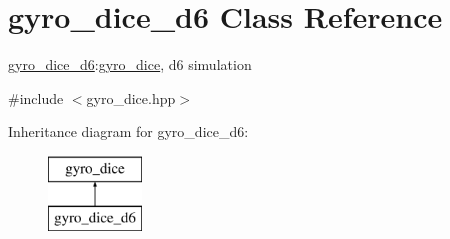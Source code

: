 \hypertarget{classgyro__dice__d6}{}\section{gyro\+\_\+dice\+\_\+d6 Class Reference}
\label{classgyro__dice__d6}


\hyperlink{classgyro__dice__d6}{gyro\+\_\+dice\+\_\+d6}\+:\hyperlink{classgyro__dice}{gyro\+\_\+dice}, d6 simulation  




{\ttfamily \#include $<$gyro\+\_\+dice.\+hpp$>$}

Inheritance diagram for gyro\+\_\+dice\+\_\+d6\+:\begin{figure}[H]
\begin{center}
\leavevmode
\includegraphics[height=2.000000cm]{classgyro__dice__d6}
\end{center}
\end{figure}
